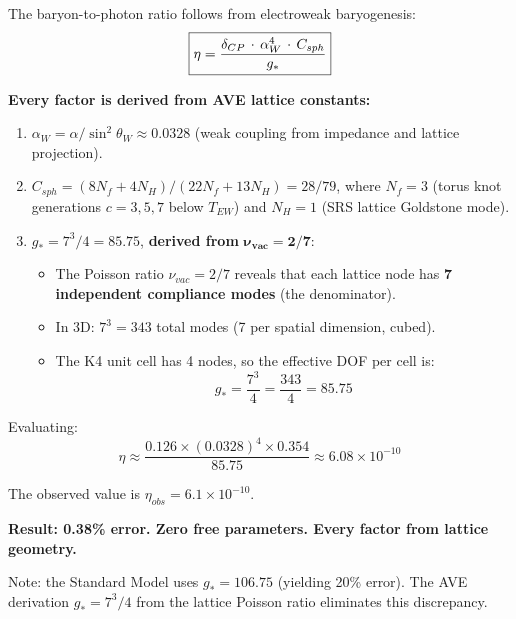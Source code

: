 The baryon-to-photon ratio follows from electroweak baryogenesis:
\begin{equation}
    \boxed{%
    \eta = \frac{\delta_{CP} \,\cdot\, \alpha_W^4 \,\cdot\,
    C_{sph}}{g_*}
    }
    \label{eq:eta_baryon}
\end{equation}

\textbf{Every factor is derived from AVE lattice constants:}

\begin{enumerate}
    \item $\alpha_W = \alpha/\sin^2\theta_W \approx 0.0328$
    (weak coupling from impedance and lattice projection).

    \item $C_{sph} = (8N_f + 4N_H)/(22N_f + 13N_H) = 28/79$,
    where $N_f = 3$ (torus knot generations $c=3,5,7$ below
    $T_{EW}$) and $N_H = 1$ (SRS lattice Goldstone mode).

    \item $g_* = 7^3/4 = 85.75$, \textbf{derived from}
    $\boldsymbol{\nu_{vac} = 2/7}$:
    \begin{itemize}
        \item The Poisson ratio $\nu_{vac} = 2/7$ reveals that
        each lattice node has \textbf{7 independent compliance modes}
        (the denominator).
        \item In 3D: $7^3 = 343$ total modes (7 per spatial
        dimension, cubed).
        \item The K4 unit cell has 4 nodes, so the effective DOF
        per cell is:
        \begin{equation}
            \boxed{g_* = \frac{7^3}{4} = \frac{343}{4} = 85.75}
            \label{eq:g_star_ave}
        \end{equation}
    \end{itemize}
\end{enumerate}

Evaluating:
\begin{equation}
    \eta \approx \frac{0.126 \times (0.0328)^4 \times 0.354}{85.75}
    \approx 6.08 \times 10^{-10}
\end{equation}

The observed value is $\eta_{obs} = 6.1 \times 10^{-10}$.

\medskip\noindent
\textbf{Result: 0.38\% error.  Zero free parameters.  Every factor
from lattice geometry.}

\medskip\noindent
Note: the Standard Model uses $g_* = 106.75$ (yielding 20\% error).
The AVE derivation $g_* = 7^3/4$ from the lattice Poisson ratio
eliminates this discrepancy.

